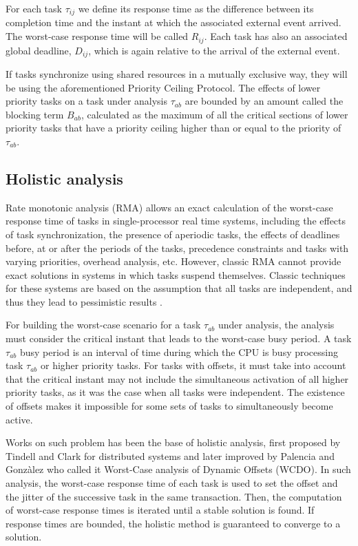 \documentclass{article}
\begin{document}
For each task $\tau_{ij}$ we define its response time as the difference between its completion time and the instant at which the associated external event arrived. The worst-case response time will be called $R_{ij}$. Each task has also an associated global deadline, $D_{ij}$, which is again relative to the arrival of the external event.

If tasks synchronize using shared resources in a mutually exclusive way, they will be using the aforementioned Priority Ceiling Protocol. The effects of lower priority tasks on a task under analysis $\tau_{ab}$ are bounded by an amount called the blocking term $B_{ab}$, calculated as the maximum of all the critical sections of lower priority tasks that have a priority ceiling higher than or equal to the priority of $\tau_{ab}$.

\subsection{Holistic analysis}

Rate monotonic analysis (RMA) \cite{rm-dm} allows an exact calculation of the worst-case response time of tasks in single-processor real time systems, including the effects of task synchronization, the presence of aperiodic tasks, the effects of deadlines before, at or after the periods of the tasks, precedence constraints and tasks with varying priorities, overhead analysis, etc. However, classic RMA \cite{practitioner-common-data} cannot provide exact solutions in systems in which tasks suspend themselves. Classic techniques for these systems are based on the assumption that all tasks are independent, and thus they lead to pessimistic results \cite{pessimistic-rma}.

For building the worst-case scenario for a task $\tau_{ab}$ under analysis, the analysis must consider the critical instant that leads to the worst-case busy period. A task $\tau_{ab}$ busy period is an interval of time during which the CPU is busy processing task $\tau_{ab}$ or higher priority tasks. For tasks with offsets, it must take into account that the critical instant may not include the simultaneous activation of all higher priority tasks, as it was the case when all tasks were independent. The existence of offsets makes it impossible for some sets of tasks to simultaneously become active.

Works on such problem has been the base of holistic analysis, first proposed by Tindell and Clark \cite{tindell-offsets} for distributed systems and later improved by Palencia and Gonzàlez \cite{pessimistic-rma} who called it Worst-Case analysis of Dynamic Offsets (WCDO). In such analysis, the worst-case response time of each task is used to set the offset and the jitter of the successive task in the same transaction. Then, the computation of worst-case response times is iterated until a stable solution is found. If response times are bounded, the holistic method is guaranteed to converge to a solution.
\end{document}
